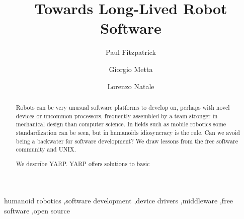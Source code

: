 \begin{frontmatter}



\title{Towards Long-Lived Robot Software}


\author[at_iit]{Paul Fitzpatrick}
\author[at_iit,at_dist]{Giorgio Metta}
\author[at_iit]{Lorenzo Natale}

\address[at_iit]{
Italian Institute of Technology \\
Via Morego, 30 \\ 16163 Genova, Italy
}
\address[at_dist]{
LIRA-Lab, University of Genoa \\
Viale F. Causa, 13 \\
16145 Genova, Italy
}

\begin{abstract}

Robots can be very unusual software platforms to develop on, perhaps
with novel devices or uncommon processors, frequently assembled by a
team stronger in mechanical design than computer science.  In fields
such as mobile robotics some standardization can be seen, but in
humanoids idiosyncracy is the rule.  Can we avoid being a backwater for
software development?  We draw lessons from the free software community
and UNIX.

We describe YARP.  YARP offers solutions to basic 







\end{abstract}

\begin{keyword}

humanoid robotics \sep software development \sep device drivers \sep middleware \sep free software \sep open source


\end{keyword}

\end{frontmatter}


